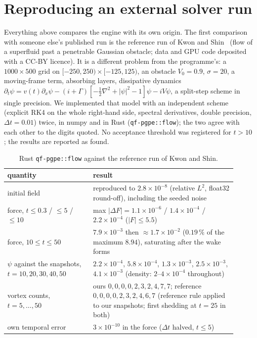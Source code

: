 \documentclass[11pt,a4paper]{article}
\begin{document}
\section{Reproducing an external solver run}\label{sec:external}

Everything above compares the engine with its own origin. The first comparison with someone else's published run is the reference run of Kwon and Shin~\cite{KwonShin2026} (flow of a superfluid past a penetrable Gaussian obstacle; data and GPU code deposited with a CC-BY licence). It is a different problem from the programme's: a $1000\times500$ grid on $[-250,250)\times[-125,125)$, an obstacle $V_0=0.9$, $\sigma=20$, a moving-frame term, absorbing layers, dissipative dynamics $\partial_t\psi=v(t)\partial_x\psi-(i+\Gamma)[-\tfrac12\nabla^2+|\psi|^2-1]\psi-iV\psi$, a split-step scheme in single precision.
We implemented that model with an independent scheme (explicit RK4 on the whole right-hand side, spectral derivatives, double precision, $\Delta t=0.01$) twice, in numpy and in Rust (\texttt{qf-pgpe::flow}); the two agree with each other to the digits quoted.
No acceptance threshold was registered for $t>10$; the results are reported as found.

\begin{table}[h]\centering\small
\begin{tabular}{p{0.34\linewidth}p{0.58\linewidth}}\toprule
quantity & result\\\midrule
initial field & reproduced to $2.8\times10^{-8}$ (relative $L^2$, float32 round-off), including the seeded noise\\
force, $t\le0.3$ / $\le5$ / $\le10$ & max $|\Delta F|=1.1\times10^{-6}$ / $1.4\times10^{-4}$ / $2.2\times10^{-4}$ ($|F|\le5.5$)\\
force, $10\le t\le50$ & $7.9\times10^{-3}$ then $\approx1.7\times10^{-2}$ ($0.19\,\%$ of the maximum $8.94$), saturating after the wake forms\\
$\psi$ against the snapshots, $t=10,20,30,40,50$ & $2.2\times10^{-4}$, $5.8\times10^{-4}$, $1.3\times10^{-3}$, $2.5\times10^{-3}$, $4.1\times10^{-3}$ (density: $2$--$4\times10^{-4}$ throughout)\\
vortex counts, $t=5,\dots,50$ & ours $0,0,0,0,2,3,2,4,7,7$; reference $0,0,0,0,2,3,2,4,6,7$ (reference rule applied to our snapshots; first shedding at $t=25$ in both)\\
own temporal error & $3\times10^{-10}$ in the force ($\Delta t$ halved, $t\le5$)\\\bottomrule
\end{tabular}
\caption{Rust \texttt{qf-pgpe::flow} against the reference run of Kwon and Shin.}\label{tab:ks}
\end{table}
\end{document}
